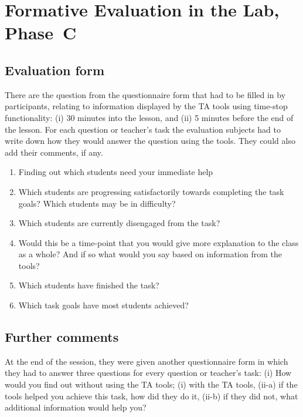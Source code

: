 
\section{Formative Evaluation in the Lab, Phase~C}
\label{sec:form-eval-with}

\subsection{Evaluation form}
\label{sec:evaluation-form}

There are the question from the questionnaire form that had to be
filled in by participants, relating to information displayed by the TA
tools using time-stop functionality: (i) 30 minutes into the lesson,
and (ii) 5 minutes before the end of the lesson. For each question or
teacher's task the evaluation subjects had to write down how they
would answer the question using the tools. They could also add their
comments, if any.

\begin{enumerate}
\item Finding out which students need your immediate help
\item Which students are progressing satisfactorily towards completing
  the task goals? Which students may be in difficulty?
\item Which students are currently disengaged from the task?
\item Would this be a time-point that you would give more explanation
  to the class as a whole? And if so what would you say based on
  information from the tools? 
\item Which students have finished the task?
\item Which task goals have most students achieved?
\end{enumerate}

\subsection{Further comments}
\label{sec:further-comments}

At the end of the session, they were given another questionnaire form
in which they had to answer three questions for every question or
teacher's task: (i) How would you find out without using the TA tools;
(i) with the TA tools, (ii-a) if the tools helped you achieve this
task, how did they do it, (ii-b) if they did not, what additional
information would help you?

